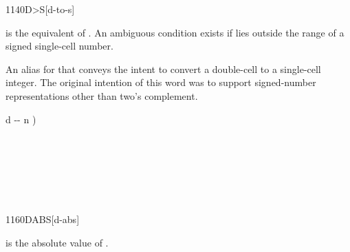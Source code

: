 \vspace*{-1ex}
\begin{worddef}[DtoS]{1140}{D>S}[d-to-s]
\item {}

	 is the equivalent of . An ambiguous condition
	exists if  lies outside the range of a signed single-cell
	number.

	\begin{rationale} %
		An alias for  that conveys the intent to convert
		a double-cell to a single-cell integer.  The original intention of this
		word was to support signed-number representations other than
		two's complement.
	\end{rationale}

	\begin{implement} %
		\word{:}   d -{}- n ) \\
		\tab {} \\
		\word{;} \\[1ex]
	\end{implement}

	\begin{testing} %
		 \\
		 \\
		 \\
	\end{testing}
\end{worddef}


\begin{worddef}{1160}{DABS}[d-abs]
\item {}

	 is the absolute value of .

	\begin{testing}
		 \\
		 \\
		 \\
	\end{testing}
\end{worddef}

